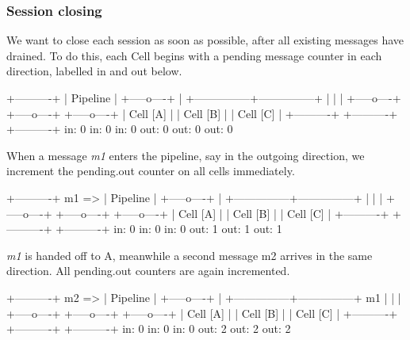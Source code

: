 \subsubsection*{Session closing}

We want to close each session as soon as possible, after all existing messages have drained. To do this, each {\ttfamily Cell} begins with a pending message counter in each direction, labelled {\ttfamily in} and {\ttfamily out} below.

\begin{DoxyVerb}                          +----------+
                          | Pipeline |
                          +-----o----+
                                |
                +---------------+---------------+
                |               |               |
          +-----o----+    +-----o----+    +-----o----+
          | Cell [A] |    | Cell [B] |    | Cell [C] |
          +----------+    +----------+    +----------+
             in: 0           in: 0           in: 0
            out: 0          out: 0          out: 0
\end{DoxyVerb}


When a message {\itshape m1} enters the pipeline, say in the {\ttfamily outgoing} direction, we increment the {\ttfamily pending.\+out} counter on all cells immediately.

\begin{DoxyVerb}                          +----------+
                    m1 => | Pipeline |
                          +-----o----+
                                |
                +---------------+---------------+
                |               |               |
          +-----o----+    +-----o----+    +-----o----+
          | Cell [A] |    | Cell [B] |    | Cell [C] |
          +----------+    +----------+    +----------+
             in: 0           in: 0           in: 0
            out: 1          out: 1          out: 1
\end{DoxyVerb}


{\itshape m1} is handed off to {\ttfamily A}, meanwhile a second message {\ttfamily m2} arrives in the same direction. All {\ttfamily pending.\+out} counters are again incremented.

\begin{DoxyVerb}                          +----------+
                    m2 => | Pipeline |
                          +-----o----+
                                |
                +---------------+---------------+
            m1  |               |               |
          +-----o----+    +-----o----+    +-----o----+
          | Cell [A] |    | Cell [B] |    | Cell [C] |
          +----------+    +----------+    +----------+
             in: 0           in: 0           in: 0
            out: 2          out: 2          out: 2
\end{DoxyVerb}


